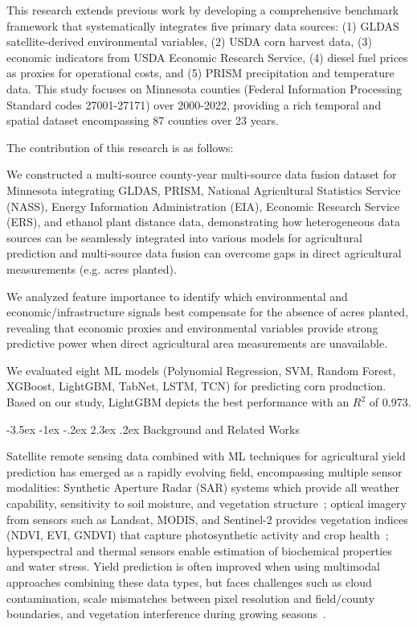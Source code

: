 \documentclass[10pt,twocolumn]{article}
\makeatletter
\renewcommand\section{\@startsection{section}{1}{\z@}%
  {-3.5ex \@plus -1ex \@minus -.2ex}%
  {2.3ex \@plus.2ex}%
  {\normalfont\large\bfseries}}
\makeatother
\begin{document}
This research extends previous work by developing a comprehensive benchmark framework that systematically integrates five primary data sources: (1) GLDAS satellite-derived environmental variables, (2) USDA corn harvest data, (3) economic indicators from USDA Economic Research Service, (4) diesel fuel prices as proxies for operational costs, and (5) PRISM precipitation and temperature data.
This study focuses on Minnesota counties (Federal Information Processing Standard codes 27001-27171) over 2000-2022, providing a rich temporal and spatial dataset encompassing 87 counties over 23 years.

The contribution of this research is as follows:

We constructed a multi-source county-year multi-source data fusion dataset for Minnesota integrating GLDAS, PRISM, National Agricultural Statistics Service (NASS), Energy Information Administration (EIA), Economic Research Service (ERS), and ethanol plant distance data, demonstrating how heterogeneous data sources can be seamlessly integrated into various models for agricultural prediction and multi-source data fusion can overcome gaps in direct agricultural measurements (e.g. acres planted).

We analyzed feature importance to identify which environmental and economic/infrastructure signals best compensate for the absence of acres planted, revealing that economic proxies and environmental variables provide strong predictive power when direct agricultural area measurements are unavailable.

We evaluated eight ML models (Polynomial Regression, SVM, Random Forest, XGBoost, LightGBM, TabNet, LSTM, TCN) for predicting corn production.
Based on our study, LightGBM depicts the best performance with an \(R^2\) of \num{0.973}.

\section{Background and Related Works}

Satellite remote sensing data combined with ML techniques for agricultural yield prediction has emerged as a rapidly evolving field, encompassing multiple sensor modalities: Synthetic Aperture Radar (SAR) systems which provide all weather capability, sensitivity to soil moisture, and vegetation structure~\cite{roy2025sentinel1, esa}; optical imagery from sensors such as Landsat, MODIS, and Sentinel-2 provides vegetation indices (NDVI, EVI, GNDVI) that capture photosynthetic activity and crop health~\cite{kayad2019sentinel2}; hyperspectral and thermal sensors enable estimation of biochemical properties and water stress.
Yield prediction is often improved when using multimodal approaches combining these data types, but faces challenges such as cloud contamination, scale mismatches between pixel resolution and field/county boundaries, and vegetation interference during growing seasons~\cite{singh2025cloud}.
\end{document}
